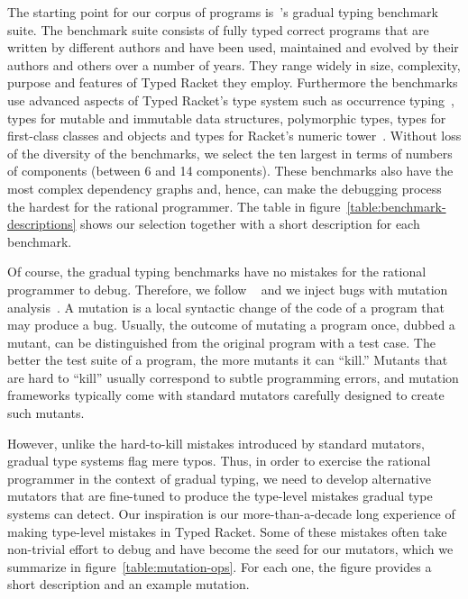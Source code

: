 The starting point for our corpus of programs
is~\citet{gtnffvf-jfp-2019}'s gradual typing benchmark suite. The
benchmark suite consists of fully typed correct programs that are written by different authors
and have been used, maintained and evolved by their authors and others over a
number of years.  They range widely in size, complexity, purpose and
features of Typed Racket they employ.  Furthermore the benchmarks use advanced aspects
of Typed Racket's type system such as occurrence
typing~\cite{tf-icfp-2010}, types for mutable and immutable data
structures, polymorphic types, types for first-class classes and objects and types for
Racket's numeric tower~\cite{stathff-padl-12}. Without loss of the diversity of the benchmarks,
we select the ten largest in terms of numbers of components (between 6 and 14 components).
These benchmarks also have the most complex dependency graphs and, hence,
can make the debugging process the hardest for the rational programmer.
The table in figure~\ref{table:benchmark-descriptions} shows our selection
together with a short description for each benchmark.



Of course, the gradual typing benchmarks have no mistakes for the rational
programmer to debug. Therefore, we follow ~\citet{lksfd-popl-2020} and we
inject bugs with mutation
analysis~\cite{jia2011analysis,demillo1978hints,lipton1971fault}.  A
mutation is a local syntactic change of the code of a program that may
produce a bug. Usually, the outcome of mutating a program once, dubbed a
mutant, can be distinguished from the original program with a test case.
The better the test suite of a program, the more mutants it can ``kill.''
Mutants that are hard to ``kill'' usually correspond to subtle programming
errors, and mutation frameworks typically come with standard mutators
carefully designed to create such mutants.

However,  unlike the hard-to-kill mistakes introduced by standard mutators, 
gradual type systems flag mere typos.  Thus, in order to
exercise the rational programmer in the context of gradual typing, 
we need to develop alternative mutators
that are fine-tuned to produce the type-level mistakes gradual type systems 
can detect. Our inspiration is our
more-than-a-decade long experience of making type-level mistakes in Typed
Racket. Some of these mistakes often take non-trivial effort to debug and
have become the seed for our mutators, which we summarize in
figure~\ref{table:mutation-ops}.  For each one, the figure provides a
short description and an example mutation.


